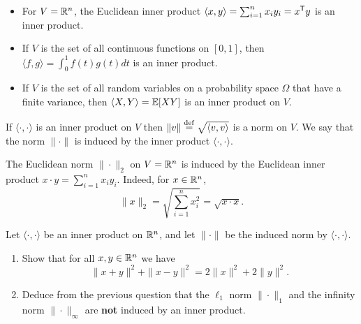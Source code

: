 \documentclass[11pt,nocut]{article}
\begin{document}
\begin{example}
	\leavevmode
	\begin{itemize}
		\item For $V = \mathbb{R}^n$, the Euclidean inner product $\langle x,y\rangle = \sum_{i=1}^n x_i y_i = x^{{\sf T}} y$ is an inner product.
		\item If $V$ is the set of all continuous functions on $[0,1]$, then $\langle f,g\rangle = \int_0^1 f(t) g(t) dt$ is an inner product.
		\item If $V$ is the set of all random variables on a probability space $\Omega$ that have a finite variance, then $\langle X, Y \rangle = \mathbb{E}[XY]$ is an inner product on $V$.
	\end{itemize}
\end{example}

\begin{proposition}
	If $\langle \cdot, \cdot \rangle$ is an inner product on $V$ then $\| v \| \overset{\rm def}{=} \sqrt{\langle v, v \rangle}$ is a norm on $V$. We say  that the norm $\| \cdot \|$ is induced by the inner product $\langle \cdot, \cdot \rangle$.
\end{proposition}

\begin{remark}
	The Euclidean norm $\| \cdot \|_2$ on $V=\mathbb{R}^n$ is induced by the Euclidean inner product $x \cdot y = \sum_{i=1}^n x_i y_i$. Indeed, for $x \in \mathbb{R}^n$,
	$$
	\|x\|_2 = \sqrt{\sum_{i=1}^n x_i^2} = \sqrt{x \cdot x}.
	$$
\end{remark}
\begin{exercise}
	Let $\langle \cdot, \cdot \rangle$ be an inner product on $\mathbb{R}^n$, and let $\| \cdot \|$ be the induced norm by $\langle \cdot, \cdot \rangle$.
	\begin{enumerate}[label=\normalfont(\textbf{\alph*})]
		\item Show that for all $x,y \in \mathbb{R}^n$ we have
			$$
			\|x+y\|^2 + \|x-y\|^2 = 2 \|x\|^2 + 2 \|y\|^2.
			$$
		\item Deduce from the previous question that the $\ell_1$ norm $\| \cdot \|_1$ and the infinity norm $\| \cdot \|_{\infty}$ are \textbf{not} induced by an inner product.
	\end{enumerate}
\end{exercise}
\end{document}
